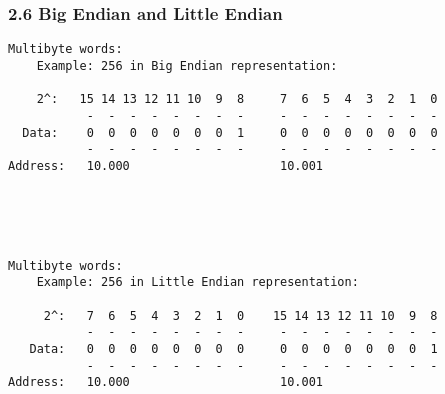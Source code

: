 \begin{frame}[fragile]
  \frametitle{2.6 Big Endian and Little Endian}
	\begin{lstlisting}[basicstyle=\tiny]
Multibyte words:
	Example: 256 in Big Endian representation:

    2^:   15 14 13 12 11 10  9  8     7  6  5  4  3  2  1  0
           -  -  -  -  -  -  -  -     -  -  -  -  -  -  -  - 
  Data:    0  0  0  0  0  0  0  1     0  0  0  0  0  0  0  0 
           -  -  -  -  -  -  -  -     -  -  -  -  -  -  -  - 
Address:   10.000                     10.001 




            
Multibyte words:
	Example: 256 in Little Endian representation:

     2^:   7  6  5  4  3  2  1  0    15 14 13 12 11 10  9  8 
           -  -  -  -  -  -  -  -     -  -  -  -  -  -  -  - 
   Data:   0  0  0  0  0  0  0  0     0  0  0  0  0  0  0  1 
           -  -  -  -  -  -  -  -     -  -  -  -  -  -  -  - 
Address:   10.000                     10.001 
	\end{lstlisting}
\end{frame}


